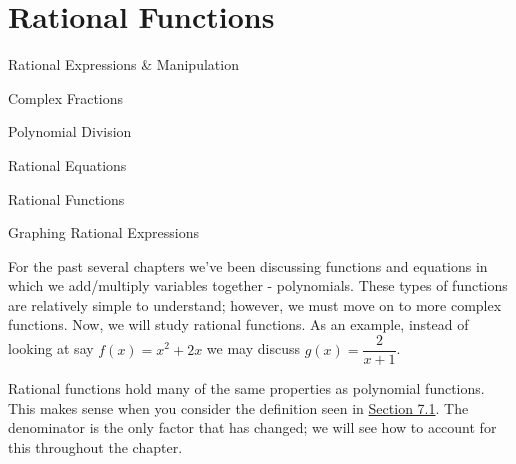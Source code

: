 \documentclass[lang=en,11pt]{elegantbook}
\begin{document}
\chapter{Rational Functions}
\begin{introduction}[Contents]
\item Rational Expressions \& Manipulation
\item Complex Fractions
\item Polynomial Division
\item Rational Equations
\item Rational Functions
\item Graphing Rational Expressions
\end{introduction}
\noindent For the past several chapters we've been discussing functions and equations in which we add/multiply variables together - polynomials. These types of functions are relatively simple to understand; however, we must move on to more complex functions. Now, we will study rational functions. As an example, instead of looking at say $f(x)=x^2+2x$ we may discuss $g(x)=\dfrac{2}{x+1}$.

Rational functions hold many of the same properties as polynomial functions.  This makes sense when you consider the definition seen in \hyperlink{section.7.1}{Section 7.1}.  The denominator is the only factor that has changed; we will see how to account for this throughout the chapter.
\end{document}
